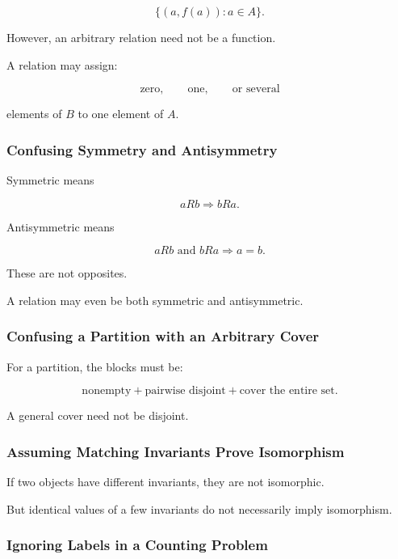 \[
\{(a,f(a)):a\in A\}.
\]

However, an arbitrary relation need not be a function.

A relation may assign:

\[
\text{zero},
\qquad
\text{one},
\qquad
\text{or several}
\]

elements of \(B\) to one element of \(A\).

\subsubsection{Confusing Symmetry and Antisymmetry}

Symmetric means

\[
aRb\Longrightarrow bRa.
\]

Antisymmetric means

\[
aRb\text{ and }bRa
\Longrightarrow
a=b.
\]

These are not opposites.

A relation may even be both symmetric and antisymmetric.

\subsubsection{Confusing a Partition with an Arbitrary Cover}

For a partition, the blocks must be:

\[
\boxed{
\text{nonempty}
+
\text{pairwise disjoint}
+
\text{cover the entire set}.
}
\]

A general cover need not be disjoint.

\subsubsection{Assuming Matching Invariants Prove Isomorphism}

If two objects have different invariants, they are not isomorphic.

But identical values of a few invariants do not necessarily imply
isomorphism.

\subsubsection{Ignoring Labels in a Counting Problem}

